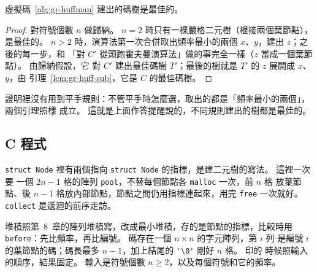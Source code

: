 \begin{theorem}
\label{thm:gr-huffman}
虛擬碼~\ref{alg:gr-huffman} 建出的碼樹是最佳的。
\end{theorem}

\begin{proof}
對符號個數 $n$ 做歸納。 $n = 2$ 時只有一棵嚴格二元樹（根接兩個葉節點），是最佳的。
$n > 2$ 時，演算法第一次合併取出頻率最小的兩個 $x$、$y$，建出 $z$；之後的每一步，和
「對 $C'$ 從頭跑霍夫曼演算法」做的事完全一樣（$z$ 當成一個葉節點）。 由歸納假設，它
對 $C'$ 建出最佳碼樹 $T'$；最後的樹就是 $T'$ 的 $z$ 展開成 $x$、$y$，由
引理~\ref{lem:gr-huff-sub}，它是 $C$ 的最佳碼樹。
\end{proof}

證明裡沒有用到平手規則：不管平手時怎麼選，取出的都是「頻率最小的兩個」，兩個引理照樣
成立。 這就是上面作答提醒說的，不同規則建出的樹都是最佳的。

\subsection{C 程式}

\begin{cbookrecap}
\texttt{struct Node} 裡有兩個指向 \texttt{struct Node} 的指標，是建二元樹的寫法。 這裡一次要
一個 $2n - 1$ 格的陣列 \texttt{pool}，不替每個節點各 \texttt{malloc} 一次，前 $n$ 格
放葉節點、後 $n - 1$ 格放內部節點，節點之間仍用指標連起來，用完 \texttt{free} 一次就好。
\texttt{collect} 是遞迴的前序走訪。
\end{cbookrecap}

堆積照第~8~章的陣列堆積寫，改成最小堆積，存的是節點的指標，比較時用
\texttt{before}：先比頻率，再比編號。 碼存在一個 $n \times n$ 的字元陣列，第 $i$ 列
是編號 $i$ 的葉節點的碼；碼長最多 $n - 1$，加上結尾的 \verb|'\0'| 剛好 $n$ 格。 印的
時候照輸入的順序，結果固定。 輸入是符號個數 $n \ge 2$，以及每個符號和它的頻率。

